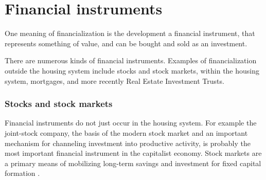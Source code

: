 \section{Financial instruments} \label{section-financial-instruments}
One meaning of financialization is the development  
a \gls{financial instrument}, that represents something of value, and can be bought and sold as an investment.

There are numerous kinds of financial instruments. Examples of financialization outside the housing system include stocks and stock markets, within the housing system, mortgages, and more recently Real Estate Investment Trusts.

\subsubsection{Stocks and stock markets}
Financial instruments do not just occur in the housing system. 
For example the \gls{joint-stock company}, the basis of the modern stock market and an important mechanism for channeling investment into productive activity,  is probably the most important financial instrument in the capitalist economy.  Stock markets are %
a primary means of %
mobilizing long-term savings and investment for fixed capital formation \cite{azfarMarketMobilizedCapital2003}.  


